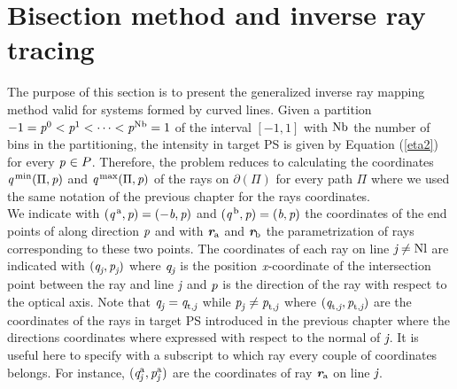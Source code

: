 \section{Bisection method and inverse ray tracing}\label{sec:raymapping_explanation}
The purpose of this section is to present the generalized inverse ray mapping method valid for systems formed by curved lines. 
Given a partition $-1 = \textit{p}^0<\textit{p}^1<\cdots<\textit{p}^{\textrm{Nb}}=1$ of the interval $[-1,1]$ with $\textrm{Nb}$ the number of bins in the partitioning, the intensity in target PS is given by Equation (\ref{eta2}) for every $\textit{p}_{\textrm{} \textit{}}\in P$.
Therefore, the problem reduces to calculating the coordinates 
$\textit{q}^{\textrm{\,min}}(\Pi, \textit{p})$ and $\textit{q}^{\textrm{\,max}}(\Pi, \textit{p})$ of the rays on $\partial$$(\Pi)$ for every path $\Pi$ where we used the same notation of the previous chapter for the rays coordinates.
\\ \indent 
We indicate with $(\textit{q}^{\,\textrm{a}}, \textit{p})= (-\textit{b}, \textit{p})$ and $(\textit{q}^{\,\textrm{b}}, \textit{p}) = (\textit{b}, \textit{p})$ the coordinates of the end points of  along direction $\textit{p}$ and with $\textit{\textbf{r}}_{\textrm{a}}$ and $\textit{\textbf{r}}_{\textrm{b}}$ the parametrization of rays corresponding to these two points.
The coordinates of each ray on line $\textit{j}\neq \textrm{Nl}$ are indicated with $(\textit{q}_{\textit{j}}, \textit{p}_{\textit{j}})$ where $\textit{q}_{\textit{j}}$ is the position $\textit{x}$-coordinate of the intersection point between the ray and line $\textit{j}$ and $\textit{p}$ is the direction of the ray with respect to the optical axis. Note that $\textit{q}_{\textrm{\textit{j}} \textit{}}=\textit{q}_{\textrm{t,} \textit{\textit{j}}}$ while $\textit{p}_{\textrm{\textit{j}} \textit{}}\neq\textit{p}_{\textrm{t,} \textit{\textit{j}}}$ where $(\textit{q}_{\textrm{t,} \textit{\textit{j}}},\textit{p}_{\textrm{t,} \textit{\textit{j}}})$ are the coordinates of the rays in target PS  introduced in the previous chapter where the directions coordinates where expressed with respect to the normal of $\textit{j}$. It is useful here to specify with a subscript to which ray every couple of coordinates belongs. For instance, $(\textit{q}_{\textrm{\textit{j}} \textit{}}^{\textrm{a}}, \textit{p}_{\textrm{\textit{j}} \textit{}}^{\textrm{a}})$ are the coordinates of ray $\textit{\textbf{r}}_{\textrm{a}}$ on line $\textit{j}$.\\ \indent 
